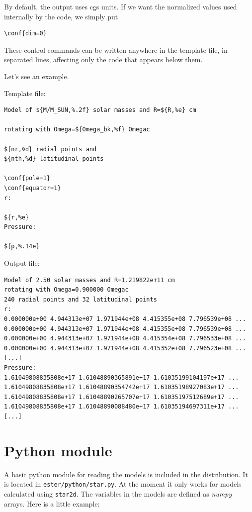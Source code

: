 By default, the output uses cgs units. If we want the normalized values used internally by
the code, we simply put
\begin{verbatim}
\conf{dim=0}
\end{verbatim}

These control commands can be written anywhere in the template file, in separated lines, 
affecting only the code that appears below them.

Let's see an example.

Template file:
\begin{verbatim}
Model of ${M/M_SUN,%.2f} solar masses and R=${R,%e} cm

rotating with Omega=${Omega_bk,%f} Omegac

${nr,%d} radial points and 
${nth,%d} latitudinal points

\conf{pole=1}
\conf{equator=1}
r:

${r,%e}
Pressure:

${p,%.14e}

\end{verbatim} 

Output file:
\begin{verbatim}
Model of 2.50 solar masses and R=1.219822e+11 cm
rotating with Omega=0.900000 Omegac
240 radial points and 32 latitudinal points
r:
0.000000e+00 4.944313e+07 1.971944e+08 4.415355e+08 7.796539e+08 ...
0.000000e+00 4.944313e+07 1.971944e+08 4.415355e+08 7.796539e+08 ...
0.000000e+00 4.944313e+07 1.971944e+08 4.415354e+08 7.796533e+08 ...
0.000000e+00 4.944313e+07 1.971944e+08 4.415352e+08 7.796523e+08 ...
[...]
Pressure:
1.61049808835808e+17 1.61048890365891e+17 1.61035199104197e+17 ...
1.61049808835808e+17 1.61048890354742e+17 1.61035198927083e+17 ...
1.61049808835808e+17 1.61048890265707e+17 1.61035197512689e+17 ...
1.61049808835808e+17 1.61048890088480e+17 1.61035194697311e+17 ...
[...]
\end{verbatim} 


\section{Python module}

A basic python module for reading the models is included in the distribution. It is located
in {\tt ester/python/star.py}. At the moment it only works for models calculated using
{\tt star2d}. The variables in the models are defined as \emph{numpy}
arrays. Here is a little example:

